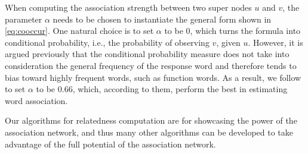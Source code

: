%
When computing the association strength between two super nodes $u$ and
$v$, the parameter $\alpha$ needs to be chosen to instantiate the
general form shown in \eqref{eq:cooccur}. One natural choice is to
set $\alpha$ to be 0, which turns the formula into conditional
probability, i.e., the probability of observing $v$, given $u$.
However, it is argued previously \cite{Wettler:1993,asso09} that 
the conditional probability measure does not take into consideration the
general frequency of the response word and therefore tends to bias
toward highly frequent words, such as function words. As a result, 
we follow \cite{Wettler:1993} to set $\alpha$ to be 0.66, 
which, according to them, perform the best in estimating word association. 

Our algorithms for relatedness computation are for showcasing the power of 
the association network, and thus many other algorithms
can be developed to  take advantage of the full potential of the association network.
